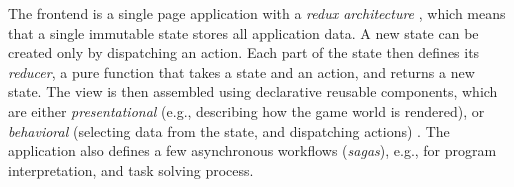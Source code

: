 The frontend is a single page application with a \emph{redux architecture}
\cite[ch.\,12]{flux},
which means that a single immutable state stores all application data.
A new state can be created only by dispatching an action.
Each part of the state then defines its \emph{reducer},
a pure function that takes a state and an action, and returns a new state.
The view is then assembled using declarative reusable
components, which are
either \emph{presentational} (e.g., describing how the game world is
rendered), or \emph{behavioral} (selecting data from the state, %
and dispatching actions) \cite{react}. %
The application also defines a few asynchronous workflows (\emph{sagas}),
e.g., for program interpretation, and task solving process. %
%


